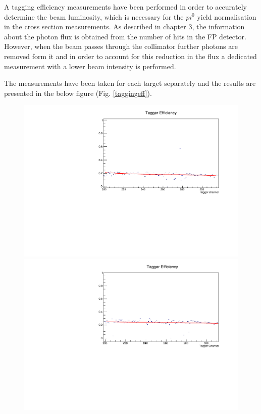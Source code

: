 \indent A tagging efficiency measurements have been performed in order to accurately determine the beam luminosity, which is necessary for the $pi^{0}$ yield normalisation in the cross section measurements. As described in chapter 3, the information about the photon flux is obtained from the number of hits in the FP detector. However, when the beam passes through the collimator further photons are removed form it and in order to account for this reduction in the flux a dedicated measurement with a lower beam intensity is performed.

\indent The measurements have been taken for each target separately and the results are presented in the below figure (Fig. \ref{taggingeff}).

\begin{figure}[H]
\begin{center}
\includegraphics[scale=0.55]{pictures/pdf/tagging_efficiency_Sn116.pdf}
\includegraphics[scale=0.55]{pictures/pdf/tagging_efficiency_Sn120.pdf}

\end{center}
\end{figure}
